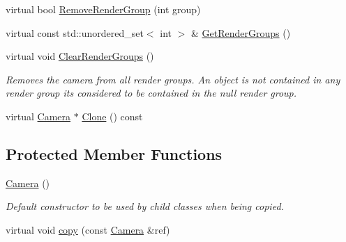 \begin{DoxyCompactItemize}
virtual bool \mbox{\hyperlink{class_geometry_engine_1_1_geometry_world_item_1_1_geometry_camera_1_1_camera_aea364f3b5f2aecabcb240825988d6bee}{Remove\+Render\+Group}} (int group)
\item 
virtual const std\+::unordered\+\_\+set$<$ int $>$ \& \mbox{\hyperlink{class_geometry_engine_1_1_geometry_world_item_1_1_geometry_camera_1_1_camera_ab61fd806095dfb39141289e7b7d25dab}{Get\+Render\+Groups}} ()
\item 
\mbox{\label{class_geometry_engine_1_1_geometry_world_item_1_1_geometry_camera_1_1_camera_ad8e59031794a9fd3f84458828942f2c9}} 
virtual void \mbox{\hyperlink{class_geometry_engine_1_1_geometry_world_item_1_1_geometry_camera_1_1_camera_ad8e59031794a9fd3f84458828942f2c9}{Clear\+Render\+Groups}} ()
\begin{DoxyCompactList}\small\item\em Removes the camera from all render groups. An object is not contained in any render group it\textquotesingle{}s considered to be contained in the null render group. \end{DoxyCompactList}\item 
virtual \mbox{\hyperlink{class_geometry_engine_1_1_geometry_world_item_1_1_geometry_camera_1_1_camera}{Camera}} $\ast$ \mbox{\hyperlink{class_geometry_engine_1_1_geometry_world_item_1_1_geometry_camera_1_1_camera_a53b37943c1929fde7396c66a36fb3c52}{Clone}} () const
\end{DoxyCompactItemize}
\subsection*{Protected Member Functions}
\begin{DoxyCompactItemize}
\item 
\mbox{\label{class_geometry_engine_1_1_geometry_world_item_1_1_geometry_camera_1_1_camera_a4721fde7db5f1ebc1c1707910deae277}} 
\mbox{\hyperlink{class_geometry_engine_1_1_geometry_world_item_1_1_geometry_camera_1_1_camera_a4721fde7db5f1ebc1c1707910deae277}{Camera}} ()
\begin{DoxyCompactList}\small\item\em Default constructor to be used by child classes when being copied. \end{DoxyCompactList}\item 
virtual void \mbox{\hyperlink{class_geometry_engine_1_1_geometry_world_item_1_1_geometry_camera_1_1_camera_a821e388a441a9b4a80e8384fc79170e3}{copy}} (const \mbox{\hyperlink{class_geometry_engine_1_1_geometry_world_item_1_1_geometry_camera_1_1_camera}{Camera}} \&ref)
\end{DoxyCompactItemize}

